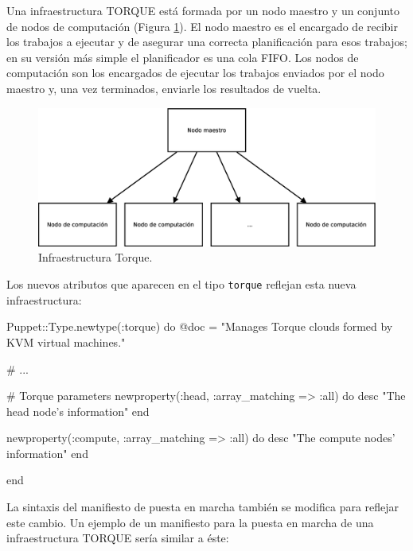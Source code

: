 Una infraestructura TORQUE está formada por un nodo maestro y un conjunto de nodos de computación (Figura \ref{figure:arquitectura-torque}). El nodo maestro es el encargado de recibir los trabajos a ejecutar y de asegurar una correcta planificación para esos trabajos; en su versión más simple el planificador es una cola FIFO. Los nodos de computación son los encargados de ejecutar los trabajos enviados por el nodo maestro y, una vez terminados, enviarle los resultados de vuelta. \\

\begin{figure} [!htbp]
  \centering
  \includegraphics[width=13.5cm]{figuras/Arquitectura_Torque.eps}
  \caption{Infraestructura Torque.}
\label{figure:arquitectura-torque}
\end{figure}

\pagebreak

Los nuevos atributos que aparecen en el tipo \texttt{torque} reflejan esta nueva infraestructura:

\begin{rubycode}
Puppet::Type.newtype(:torque) do
   @doc = "Manages Torque clouds formed by KVM virtual machines."
   
   # ...

   # Torque parameters
   newproperty(:head, :array_matching => :all) do
      desc "The head node's information"
   end
   
   newproperty(:compute, :array_matching => :all) do
      desc "The compute nodes' information"
   end
   
end
\end{rubycode}

La sintaxis del manifiesto de puesta en marcha también se modifica para reflejar este cambio. Un ejemplo de un manifiesto para la puesta en marcha de una infraestructura TORQUE sería similar a éste:

